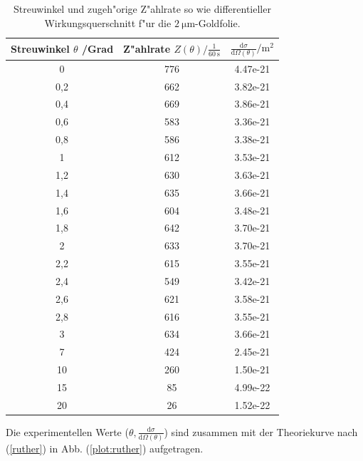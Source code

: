   \begin{table}
  \centering
  \begin{tabular}{c|c|c}

  Streuwinkel $\theta$ /Grad	&	Z"ahlrate $Z(\theta)/\frac{1}{\SI{60}{\second}}$	& $\frac{\text{d}\sigma}{\text{d}\Omega(\theta)}/\si{\meter \squared}$	 \\

  \toprule
 	0	   & 776 & 4.47e-21 \\
 	0,2	 & 662 & 3.82e-21 \\
 	0,4	 & 669 & 3.86e-21 \\
 	0,6	 & 583 & 3.36e-21 \\
  0,8  & 586 & 3.38e-21 \\
  1    & 612 & 3.53e-21 \\
  1,2  & 630 & 3.63e-21 \\
  1,4  & 635 & 3.66e-21 \\
  1,6  & 604 & 3.48e-21 \\
  1,8  & 642 & 3.70e-21 \\
  2    & 633 & 3.70e-21 \\
  2,2  & 615 & 3.55e-21 \\
  2,4  & 549 & 3.42e-21 \\
  2,6  & 621 & 3.58e-21 \\
  2,8  & 616 & 3.55e-21 \\
  3    & 634 & 3.66e-21 \\
  7    & 424 & 2.45e-21 \\
  10   & 260 & 1.50e-21 \\
  15   & 85  & 4.99e-22 \\
  20   & 26  & 1.52e-22 \\

 \bottomrule
  \end{tabular}
  \caption{Streuwinkel und zugeh"orige Z"ahlrate so wie differentieller Wirkungsquerschnitt f"ur die $\SI{2}{\micro \meter}$-Goldfolie.}
  \label{tab:ruther}
  \end{table}


  Die experimentellen Werte ($\theta,\frac{\text{d}\sigma}{\text{d}\Omega(\theta)}$) sind zusammen mit der Theoriekurve nach (\ref{ruther}) in Abb. (\ref{plot:ruther}) aufgetragen.

